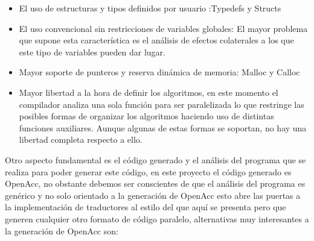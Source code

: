 \begin{itemize}

\item El uso de estructuras y tipos definidos por usuario :Typedefs y Structs

\item El uso convencional sin restricciones de variables globales: El mayor problema que supone esta característica es el análisis de efectos colaterales a los que este tipo de variables pueden dar lugar.

\item Mayor soporte de punteros y reserva dinámica de memoria: Malloc y Calloc

\item Mayor libertad a la hora de definir los algoritmos, en este momento el compilador analiza una sola función para ser paralelizada lo que restringe las posibles formas de organizar los algoritmos haciendo uso de distintas funciones auxiliares. Aunque algunas de estas formas se soportan, no hay una libertad completa respecto a ello.

\end{itemize}

Otro aspecto fundamental es el código generado y el análisis del programa que se realiza para poder generar este código, en este proyecto el código generado es OpenAcc, no obstante debemos ser conscientes de que el análisis del programa es genérico y no solo orientado a la generación de OpenAcc esto abre las puertas a la implementación de traductores al estilo del que aquí se presenta pero que generen cualquier otro formato de código paralelo, alternativas muy interesantes a la generación de OpenAcc son:


